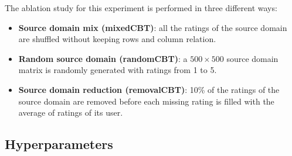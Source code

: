 The ablation study for this experiment is performed in three different ways:
\begin{itemize}
\item \textbf{Source domain mix (mixedCBT)}: all the ratings of the source domain are shuffled without keeping rows and column relation.
\item \textbf{Random source domain (randomCBT)}: a $500 \times 500$ source domain matrix is randomly generated with ratings from 1 to 5.
\item \textbf{Source domain reduction (removalCBT)}: 10\% of the ratings of the source domain are removed before each missing rating is filled with the average of ratings of its user.
\end{itemize}


\subsection{Hyperparameters}

